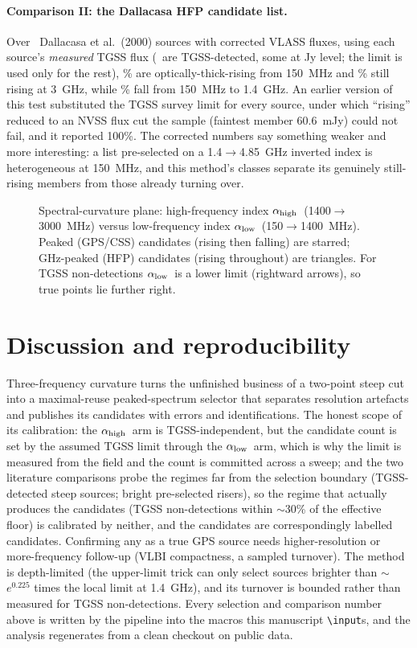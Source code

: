 \documentclass[twocolumn]{aastex631}
\newcommand{\code}[1]{\texttt{#1}}
\newcommand{\alo}{\ensuremath{\alpha_{\rm low}}}
\newcommand{\ahi}{\ensuremath{\alpha_{\rm high}}}
\begin{document}
\paragraph{Comparison II: the Dallacasa HFP candidate list.} Over \pkRealHfpN\ Dallacasa
et al.\ (2000) sources with corrected VLASS fluxes, using each source's \emph{measured} TGSS
flux (\pkRealHfpTgssDet\ are TGSS-detected, some at Jy level; the limit is used only for the
rest), \pkRealHfpRising\% are optically-thick-rising from 150~MHz and \pkRealHfpGhz\% still
rising at 3~GHz, while \pkRealHfpFallingLow\% fall from 150~MHz to 1.4~GHz. An earlier
version of this test substituted the TGSS survey limit for every source, under which
``rising'' reduced to an NVSS flux cut the sample (faintest member 60.6~mJy) could not fail,
and it reported 100\%. The corrected numbers say something weaker and more interesting: a
list pre-selected on a 1.4$\to$4.85~GHz inverted index is heterogeneous at 150~MHz, and this
method's classes separate its genuinely still-rising members from those already turning over.

\begin{figure}
\caption{Spectral-curvature plane: high-frequency index \ahi\ (1400$\to$3000~MHz) versus
low-frequency index \alo\ (150$\to$1400~MHz). Peaked (GPS/CSS) candidates (rising then falling)
are starred; GHz-peaked (HFP) candidates (rising throughout) are triangles. For TGSS
non-detections \alo\ is a lower limit (rightward arrows), so true points lie further right.}
\label{fig:curv}
\end{figure}

\section{Discussion and reproducibility}
Three-frequency curvature turns the unfinished business of a two-point steep cut into a
maximal-reuse peaked-spectrum selector that separates resolution artefacts and publishes its
candidates with errors and identifications. The honest scope of its calibration: the
\ahi\ arm is TGSS-independent, but the candidate count is set by the assumed TGSS limit
through the \alo\ arm, which is why the limit is measured from the field and the count is
committed across a sweep; and the two literature comparisons probe the regimes far from the
selection boundary (TGSS-detected steep sources; bright pre-selected risers), so the regime
that actually produces the candidates (TGSS non-detections within $\sim$30\% of the effective
floor) is calibrated by neither, and the candidates are correspondingly labelled candidates.
Confirming any as a true GPS source needs higher-resolution or more-frequency follow-up (VLBI
compactness, a sampled turnover). The method is depth-limited (the upper-limit trick can only
select sources brighter than $\sim$$e^{0.225}$ times the local limit at 1.4~GHz), and its
turnover is bounded rather than measured for TGSS non-detections. Every selection and
comparison number above is written by the pipeline into the macros this manuscript
\code{\textbackslash input}s, and the analysis regenerates from a clean checkout on public
data.
\end{document}
